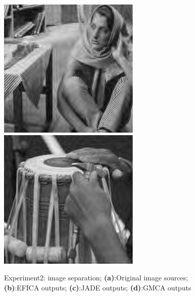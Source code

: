 \begin{figure}[!htbp]
{\begin{minipage}[b]{0.23\linewidth}
\includegraphics[width=1\linewidth]{images/gmca_out3.png}\vspace{4pt}
\includegraphics[width=1\linewidth]{images/gmca_out4.png}
\end{minipage}}
\caption{Experiment2: image separation; \textbf{(a)}:Original image sources; \textbf{(b)}:EFICA outputs; \textbf{(c)}:JADE outputs; \textbf{(d)}:GMCA outputs }
\label{BSS_ex2_1}
\end{figure}

